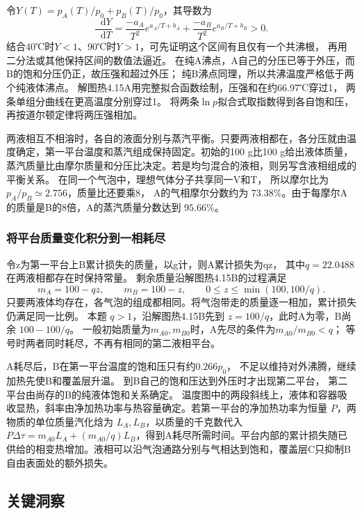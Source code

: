 \documentclass[UTF8,fontset=fandol,a4paper,11pt]{ctexart}
\newcommand{\dd}{\mathop{}\!\mathrm{d}}
\begin{document}
令$Y(T)=p_A(T)/p_0+p_B(T)/p_0$，其导数为
\[
\frac{\dd Y}{\dd T}
=\frac{-a_A}{T^2}e^{a_A/T+b_A}
+\frac{-a_B}{T^2}e^{a_B/T+b_B}>0.
\]
结合40℃时$Y<1$、90℃时$Y>1$，可先证明这个区间有且仅有一个共沸根，
再用二分法或其他保持区间的数值法逼近。
在纯A沸点，A自己的分压已等于外压，而B的饱和分压仍正，故压强和超过外压；
纯B沸点同理，所以共沸温度严格低于两个纯液体沸点。
解图热4.15A用完整拟合函数绘制，压强和在约66.97℃穿过1，
两条单组分曲线在更高温度分别穿过1。
将两条$\ln p$拟合式取指数得到各自饱和压，再按道尔顿定律将两压强相加。

两液相互不相溶时，各自的液面分别与蒸汽平衡。只要两液相都在，各分压就由温度确定，第一平台温度和蒸汽组成保持固定。初始的100 g比100 g给出液体质量，蒸汽质量比由摩尔质量和分压比决定。若是均匀混合的液相，则另写含液相组成的平衡关系。
在同一个气泡中，理想气体分子共享同一V和T，
所以摩尔比为$p_A/p_B\simeq2.756$，质量比还要乘8，
A的气相摩尔分数约为 $73.38\%$。由于每摩尔A的质量是B的8倍，A的蒸汽质量分数达到 $95.66\%$。

\subsubsection*{将平台质量变化积分到一相耗尽}
令z为第一平台上B累计损失的质量，以g计，则A累计损失为qz，
其中$q=22.0488$在两液相都存在时保持常量。
剩余质量沿解图热4.15B的过程满足
\[
m_A=100-qz,\qquad m_B=100-z,\qquad
0\le z\le\min(100,100/q).
\]
只要两液体均存在，各气泡的组成都相同。将气泡带走的质量逐一相加，累计损失仍满足同一比例。
本题 $q>1$，沿解图热4.15B先到 $z=100/q$，此时A为零，B尚余 $100-100/q$。
一般初始质量为$m_{A0},m_{B0}$时，A先尽的条件为$m_{A0}/m_{B0}<q$；
等号时两者同时耗尽，不再有相同的第二液相平台。

A耗尽后，B在第一平台温度的饱和压只有约$0.266p_0$，
不足以维持对外沸腾，继续加热先使B和覆盖层升温。
到B自己的饱和压达到外压时才出现第二平台，
第二平台由尚存的B的纯液体饱和关系确定。
温度图中的两段斜线上，液体和容器吸收显热，斜率由净加热功率与热容量确定。若第一平台的净加热功率为恒量 $P$，两物质的单位质量汽化焓为 $L_A,L_B$，以质量的千克数代入 $P\Delta\tau=m_{A0}L_A+(m_{A0}/q)L_B$，得到A耗尽所需时间。平台内部的累计损失随已供给的相变热增加。液相可以沿气泡通路分别与气相达到饱和，覆盖层C只抑制B自由表面处的额外损失。




\subsection*{关键洞察}
\end{document}
